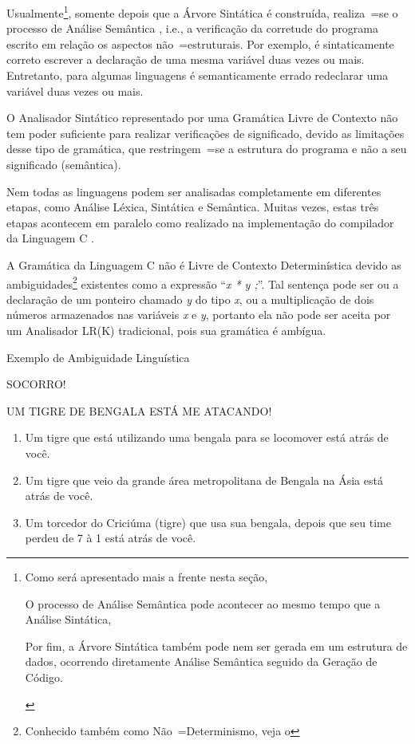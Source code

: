     Usualmente\footnote{
    Como será apresentado mais a frente nesta seção,
    \begin{inparaenum}
    \item O processo de Análise Semântica pode acontecer ao mesmo tempo que a Análise Sintática,
    \item Por fim,
    a Árvore Sintática também pode nem ser gerada em um estrutura de dados,
    ocorrendo diretamente Análise Semântica seguido da Geração de Código.
    \end{inparaenum}
    },
    somente depois que a Árvore Sintática é construída,
    realiza~=se o processo de Análise Semântica \cite{ahoCompilerDragonBook},
    i.e.,
    a verificação da corretude do programa escrito em relação os aspectos não~=estruturais.
    Por exemplo,
    é sintaticamente correto escrever a declaração de uma mesma variável duas vezes ou
    mais. Entretanto,
    para algumas linguagens é semanticamente errado redeclarar uma variável duas vezes ou
    mais.

    O Analisador Sintático representado por uma Gramática Livre de Contexto não tem poder suficiente para realizar verificações de significado,
    devido as limitações desse tipo de gramática,
    que restringem~=se a estrutura do programa e
    não a seu significado (semântica).

    Nem todas as linguagens podem ser analisadas completamente em diferentes etapas,
    como Análise Léxica, Sintática e Semântica. Muitas vezes,
    estas três etapas acontecem em paralelo como realizado na implementação do compilador da Linguagem C \cite{jourdan2017,whyCcannotBeParsedWithALR1Parser}.

    A Gramática da Linguagem C não é Livre de Contexto Determinística devido as ambiguidades\footnote{
    Conhecido também como Não~=Determinismo,
    veja o 
    }
    existentes como a expressão ``\textit{x * y ;}''.
    Tal sentença pode ser ou
    a declaração de um ponteiro chamado \textit{y} do tipo \textit{x},
    ou a multiplicação de dois números armazenados nas variáveis \textit{x} e
    \textit{y},
    portanto ela não pode ser aceita por um Analisador LR(K) tradicional,
    pois sua gramática é ambígua.

\begin{quadro}[h]
\caption{Exemplo de Ambiguidade Linguística}
\label{exemploDeAmbiguidadeLinguistica}
\begin{bluebox}
    SOCORRO!

    UM TIGRE DE BENGALA ESTÁ ME ATACANDO!

    \begin{enumerate}%
        \item Um tigre que está utilizando uma bengala para se locomover está atrás de você.
        \item Um tigre que veio da grande área metropolitana de Bengala na Ásia está atrás de você.
        \item Um torcedor do Criciúma (tigre) que usa sua bengala,
        depois que seu time perdeu de 7 à 1 está atrás de você.
    \end{enumerate}
\end{bluebox}
\end{quadro}

